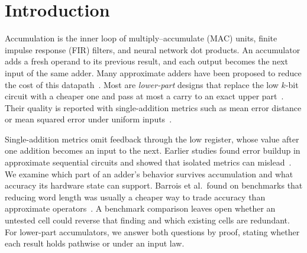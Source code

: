 \documentclass[preprint,12pt,numbers]{elsarticle}
\theoremstyle{definition}
\begin{document}
\section{Introduction}

Accumulation is the inner loop of multiply--accumulate (MAC) units, finite
impulse response (FIR) filters, and neural network dot products.
An accumulator adds a fresh operand to its previous result, and each output
becomes the next input of the same adder. Many approximate
adders have been proposed to reduce the cost of this
datapath~\cite{xu2016survey,mittal2016survey}. Most are \emph{lower-part}
designs that replace the low $k$-bit circuit with a cheaper one and
pass at most a carry to an exact upper
part~\cite{mahdiani2010loa,zhu2010eta,gupta2013ama,albicocco2012loawa}. Their
quality is reported with single-addition metrics such as mean error distance
or mean squared error under uniform
inputs~\cite{liang2013metrics,mrazek2017evoapprox}.

Single-addition metrics omit feedback through the low register, whose value
after one addition becomes an input to the next.
Earlier studies found error buildup in approximate sequential
circuits and showed that isolated metrics can
mislead~\cite{miao2012dither,kapare2016seq,chandrasekharan2016seq,park2021mac}.
We examine which part of an adder's behavior survives accumulation and
what accuracy its hardware state can support.
Barrois et al.\ found on benchmarks that reducing word length was usually a
cheaper way to trade accuracy than approximate operators~\cite{barrois2017hidden}.
A benchmark comparison leaves open whether an untested cell could reverse
that finding and which existing cells are redundant. For lower-part accumulators, we answer
both questions by proof, stating whether each result holds pathwise or under an input law.
\end{document}
